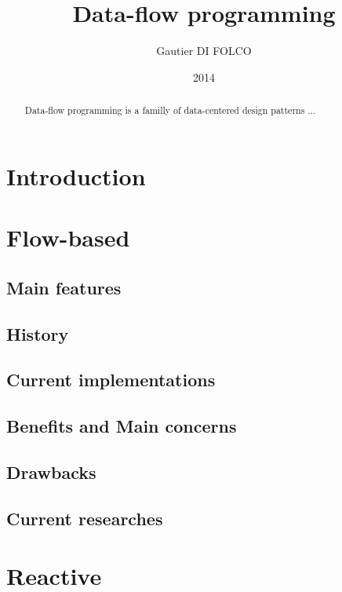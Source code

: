 \documentclass{article}
\title{Data-flow programming}
\author{Gautier DI FOLCO}
\date{2014}
\begin{document}
\maketitle

\begin{abstract}
    Data-flow programming is a familly of data-centered design patterns
    ...
\end{abstract}

\section{Introduction}\label{introduction}


\section{Flow-based}\label{flow-based}

\subsection{Main features}\label{principes}


\subsection{History}\label{historique}


\subsection{Current implementations}\label{implementations}


\subsection{Benefits and Main concerns}\label{benefices}


\subsection{Drawbacks}\label{desavanatages}


\subsection{Current researches}\label{recherches}


\section{Reactive}\label{reactive}
\end{document}
